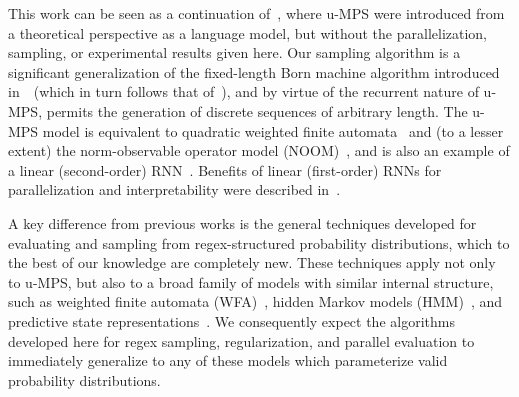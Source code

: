 This work can be seen as a continuation of~\citep{pestun2017a}, where u-MPS were introduced from a theoretical perspective as a language model, but without the parallelization, sampling, or experimental results given here. Our sampling algorithm is a significant generalization of the fixed-length Born machine algorithm introduced in~\citep{han2018}~(which in turn follows that of~\citep{ferris2012}), and by virtue of the recurrent nature of u-MPS, permits the generation of discrete sequences of arbitrary length. The u-MPS model is equivalent to quadratic weighted finite automata~\citep{bailly2011} and (to a lesser extent) the norm-observable operator model (NOOM)~\citep{zhao2010}, and is also an example of a linear (second-order) RNN~\citep{rabusseau2019}. Benefits of linear (first-order) RNNs for parallelization and interpretability were described in~\citep{martin2018, foerster2017input}.

A key difference from previous works is the general techniques developed for evaluating and sampling from regex-structured probability distributions, which to the best of our knowledge are completely new. These techniques apply not only to u-MPS, but also to a broad family of models with similar internal structure, such as weighted finite automata (WFA)~\citep{droste2009}, hidden Markov models (HMM)~\citep{rabiner1986}, and predictive state representations~\citep{littman2002}. We consequently expect the algorithms developed here for regex sampling, regularization, and parallel evaluation to immediately generalize to any of these models which parameterize valid probability distributions.

